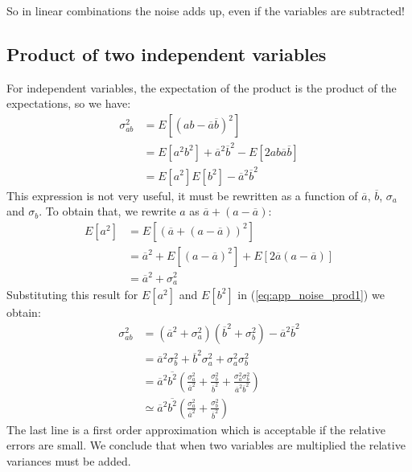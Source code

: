 So in linear combinations the noise adds up, even
if the variables are subtracted!

\subsection{Product of two independent variables}
For independent variables, the expectation of the product is the
product of the expectations, so we have:
\begin{align}
 \sigma_{ab}^2 &= E\left[\left( ab - \overline{a} \overline{b}\right)^2\right] \nonumber\\
  &= E\left[a^2b^2\right] + \overline{a}^2\overline{b}^2 - E\left[2 a b \overline{a} \overline{b}\right] \nonumber\\
  &= E\left[a^2\right] E\left[b^2\right] - \overline{a}^2 \overline{b}^2 \label{eq:app_noise_prod1}
\end{align}
This expression is not very useful, it must be rewritten as a function of
$\overline{a}$, $\overline{b}$, $\sigma_a$ and $\sigma_b$. To obtain that, we rewrite $a$
as $\overline{a} + (a - \overline{a})$:
\begin{align}
  E\left[a^2\right] &= E\left[(\overline{a} + (a - \overline{a}))^2\right] \nonumber\\
 &= \overline{a}^2 + E\left[\left( a - \overline{a} \right)^2\right] + E\left[2 \overline{a}(a - \overline{a})\right]
       \nonumber\\
 &= \overline{a}^2 + \sigma_a^2
\end{align}
Substituting this result for $E[a^2]$ and $E[b^2]$ in
(\ref{eq:app_noise_prod1}) we obtain:
\begin{align}
\sigma_{ab}^2 &= (\overline{a}^2 + \sigma_a^2)(\overline{b}^2 + \sigma_b^2) 
                     - \overline{a}^2 \overline{b}^2 \nonumber\\
 &= \overline{a}^2\sigma_b^2 + \overline{b}^2\sigma_a^2 + \sigma_a^2 \sigma_b^2
        \nonumber\\
 &= \overline{a}^2\overline{b^2}\left( \frac{\sigma_a^2}{\overline{a}^2} + 
       \frac{\sigma_b^2}{\overline{b}^2} 
     + \frac{\sigma_a^2\sigma_b^2}{\overline{a}^2\overline{b}^2}\right)\\
 &\simeq \overline{a}^2\overline{b^2}\left( \frac{\sigma_a^2}{\overline{a}^2} + 
       \frac{\sigma_b^2}{\overline{b}^2}\right)
\end{align}
The last line is a first order approximation which is acceptable if the
relative errors are small. We conclude that when two variables are multiplied
the relative variances must be added. 

